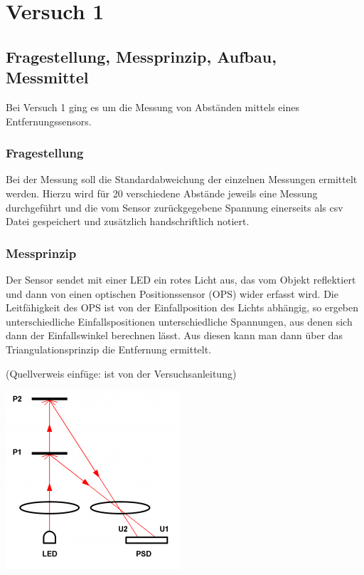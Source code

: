 \chapter{Versuch 1}
\label{chap:VERSUCH_1}

\section{Fragestellung, Messprinzip, Aufbau, Messmittel}
\label{chap:VERSUCH_1_FRAGESTELLUNG}

Bei Versuch 1 ging es um die Messung von Abständen mittels eines Entfernungssensors. 

\subsection*{Fragestellung}
	Bei der Messung soll die Standardabweichung der einzelnen Messungen ermittelt werden. Hierzu wird für 20 verschiedene Abstände jeweils eine Messung durchgeführt und die vom Sensor zurückgegebene Spannung einerseits als csv Datei gespeichert und zusätzlich handschriftlich notiert.
	
\subsection*{Messprinzip}
	Der Sensor sendet mit einer LED ein rotes Licht aus, das vom Objekt reflektiert und dann von einen optischen Positionssensor (OPS) wider erfasst wird. Die Leitfähigkeit des OPS ist von der Einfallposition des Lichts abhängig, so ergeben unterschiedliche Einfallspositionen unterschiedliche Spannungen, aus denen sich dann der Einfallswinkel berechnen lässt. Aus diesen kann man dann über das Triangulationsprinzip die Entfernung ermittelt.
	
	(Quellverweis einfüge: ist von der Versuchsanleitung)
	\begin{center}
	\includegraphics[scale=1]{media/triangulationGraphik.png}
	\label{Triangulation}
	\end{center}
	
